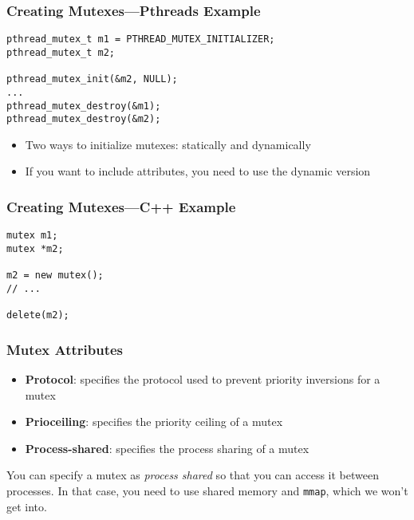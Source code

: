 \documentclass[aspectratio=43]{beamer}
\newenvironment{changemargin}[1]{%
  \begin{list}{}{%
    \setlength{\topsep}{0pt}%
    \setlength{\leftmargin}{#1}%
    \setlength{\rightmargin}{1em}
    \setlength{\listparindent}{\parindent}%
    \setlength{\itemindent}{\parindent}%
    \setlength{\parsep}{\parskip}%
  }%
  \item[]}{\end{list}}
\begin{document}
\begin{frame}[fragile]
  \frametitle{Creating Mutexes---Pthreads Example}

\begin{changemargin}{1.5cm}
  \begin{lstlisting}
pthread_mutex_t m1 = PTHREAD_MUTEX_INITIALIZER;
pthread_mutex_t m2;

pthread_mutex_init(&m2, NULL);
...
pthread_mutex_destroy(&m1);
pthread_mutex_destroy(&m2);
  \end{lstlisting}

  \begin{itemize}
    \item Two ways to initialize mutexes: statically and dynamically
    \item If you want to include attributes, you need to use the dynamic version
  \end{itemize}
\end{changemargin}

\end{frame}

\begin{frame}[fragile]
  \frametitle{Creating Mutexes---C++ Example}

\begin{changemargin}{1.5cm}
  \begin{lstlisting}
mutex m1;
mutex *m2;

m2 = new mutex();
// ...

delete(m2);
  \end{lstlisting}
\end{changemargin}

\end{frame}

\begin{frame}
  \frametitle{Mutex Attributes}

\begin{changemargin}{1.5cm}
  \begin{itemize}
    \item {\bf Protocol}: specifies the protocol used to prevent priority
      inversions for a mutex
    \item {\bf Prioceiling}: specifies the priority ceiling of a mutex
    \item {\bf Process-shared}: specifies the process sharing of a mutex
  \end{itemize}
  You can specify a mutex as {\it process shared} so that you can access it
  between processes. In that case, you need to use shared memory and {\tt mmap},
  which we won't get into.
\end{changemargin}

\end{frame}
\end{document}
